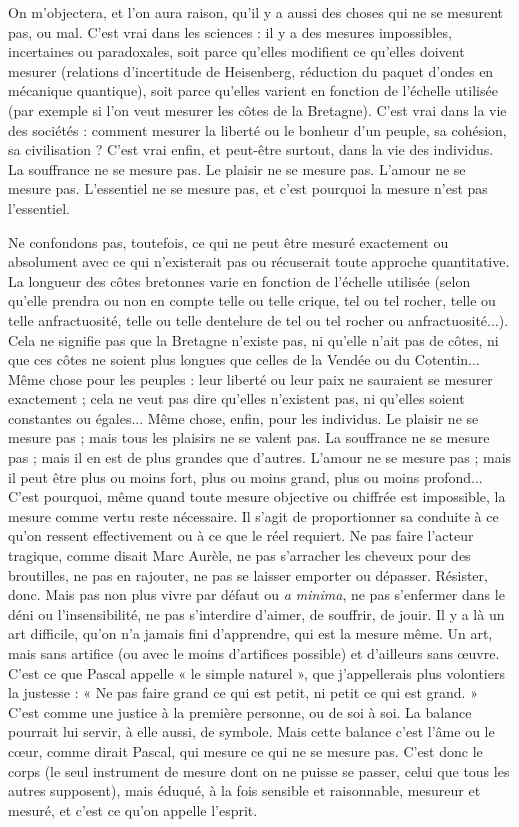 On m'objectera, et l’on aura raison, qu’il y a aussi des choses qui ne se
mesurent pas, ou mal. C’est vrai dans les sciences : il y a des mesures impossibles,
incertaines ou paradoxales, soit parce qu’elles modifient ce qu’elles doivent
mesurer (relations d’incertitude de Heisenberg, réduction du paquet
d’ondes en mécanique quantique), soit parce qu’elles varient en fonction de
l'échelle utilisée (par exemple si l’on veut mesurer les côtes de la Bretagne).
C’est vrai dans la vie des sociétés : comment mesurer la liberté ou le bonheur
d’un peuple, sa cohésion, sa civilisation ? C’est vrai enfin, et peut-être surtout,
dans la vie des individus. La souffrance ne se mesure pas. Le plaisir ne se
mesure pas. L'amour ne se mesure pas. L'essentiel ne se mesure pas, et c’est
pourquoi la mesure n’est pas l’essentiel.

Ne confondons pas, toutefois, ce qui ne peut être mesuré exactement ou
absolument avec ce qui n’existerait pas ou récuserait toute approche quantitative.
La longueur des côtes bretonnes varie en fonction de l'échelle utilisée
(selon qu’elle prendra ou non en compte telle ou telle crique, tel ou tel rocher,
telle ou telle anfractuosité, telle ou telle dentelure de tel ou tel rocher ou anfractuosité...). Cela ne signifie pas que la Bretagne n’existe pas, ni qu’elle n’ait pas
de côtes, ni que ces côtes ne soient plus longues que celles de la Vendée ou du
Cotentin... Même chose pour les peuples : leur liberté ou leur paix ne sauraient
se mesurer exactement ; cela ne veut pas dire qu’elles n’existent pas, ni
qu’elles soient constantes ou égales... Même chose, enfin, pour les individus.
Le plaisir ne se mesure pas ; mais tous les plaisirs ne se valent pas. La souffrance
ne se mesure pas ; mais il en est de plus grandes que d’autres. L'amour ne se
mesure pas ; mais il peut être plus ou moins fort, plus ou moins grand, plus ou
moins profond... C’est pourquoi, même quand toute mesure objective ou chiffrée
est impossible, la mesure comme vertu reste nécessaire. Il s’agit de proportionner
sa conduite à ce qu’on ressent effectivement ou à ce que le réel requiert.
Ne pas faire l’acteur tragique, comme disait Marc Aurèle, ne pas s’arracher les
cheveux pour des broutilles, ne pas en rajouter, ne pas se laisser emporter ou
dépasser. Résister, donc. Mais pas non plus vivre par défaut ou {\it a minima}, ne
pas s’enfermer dans le déni ou l’insensibilité, ne pas s’interdire d’aimer, de souffrir,
de jouir. Il y a là un art difficile, qu’on n’a jamais fini d’apprendre, qui
est la mesure même. Un art, mais sans artifice (ou avec le moins d’artifices possible)
et d’ailleurs sans œuvre. C’est ce que Pascal appelle « le simple naturel »,
que j’appellerais plus volontiers la justesse : « Ne pas faire grand ce qui est petit,
ni petit ce qui est grand. » C’est comme une justice à la première personne, ou
de soi à soi. La balance pourrait lui servir, à elle aussi, de symbole. Mais cette
balance c’est l’âme ou le cœur, comme dirait Pascal, qui mesure ce qui ne se
mesure pas. C’est donc le corps (le seul instrument de mesure dont on ne
puisse se passer, celui que tous les autres supposent), mais éduqué, à la fois sensible
et raisonnable, mesureur et mesuré, et c’est ce qu’on appelle l'esprit.

